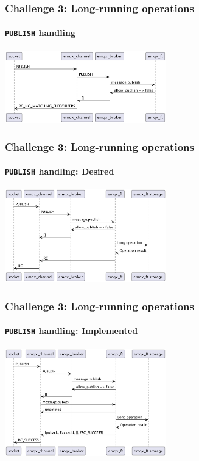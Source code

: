 \documentclass{beamer}
\begin{document}
\begin{frame}
    \frametitle{Challenge 3: Long-running operations}
    \framesubtitle{\lstinline{PUBLISH} handling}

    \begin{center}
        \includegraphics[width=7cm, keepaspectratio]{images/sync-publish.png}
    \end{center}
\end{frame}

\begin{frame}
    \frametitle{Challenge 3: Long-running operations}
    \framesubtitle{\lstinline{PUBLISH} handling: Desired}

    \begin{center}
        \includegraphics[width=7cm, keepaspectratio]{images/async-publish-needed.png}
    \end{center}
\end{frame}

\begin{frame}
    \frametitle{Challenge 3: Long-running operations}
    \framesubtitle{\lstinline{PUBLISH} handling: Implemented}

    \begin{center}
        \includegraphics[width=7cm, keepaspectratio]{images/async-publish-implemented.png}
    \end{center}
\end{frame}
\end{document}
